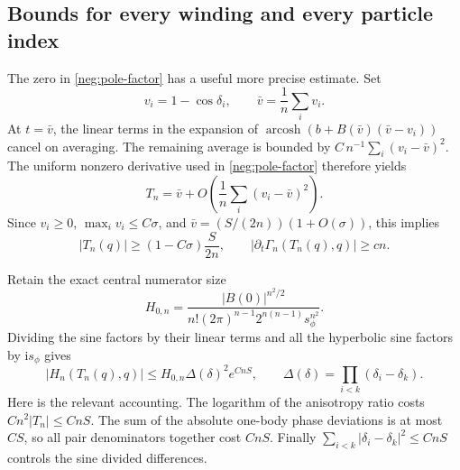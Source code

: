 \documentclass[11pt]{article}
\numberwithin{equation}{section}
\theoremstyle{definition}
\newcommand{\ii}{\mathrm i}
\begin{document}
\subsection{Bounds for every winding and every particle index}
\label{neg:all-windings}

The zero in \eqref{neg:pole-factor} has a useful more precise
estimate.  Set
\[
 v_i=1-\cos\delta_i,\qquad \bar v=\frac1n\sum_i v_i .
 \]
At \(t=\bar v\), the linear terms in the expansion of
\(\operatorname{arcosh}(b+B(\bar v)(\bar v-v_i))\) cancel on
averaging.  The remaining average is bounded by
\(C\,n^{-1}\sum_i(v_i-\bar v)^2\).  The uniform nonzero
derivative used in \eqref{neg:pole-factor} therefore yields
\[
 T_n=\bar v+
       O\!\left(\frac1n\sum_i(v_i-\bar v)^2\right).
 \]
Since \(v_i\ge0\), \(\max_i v_i\le C\sigma\), and
\(\bar v=(S/(2n))(1+O(\sigma))\), this implies
\begin{equation}
 |T_n(q)|\ge(1-C\sigma)\frac{S}{2n},
 \qquad
 |\partial_t\Gamma_n(T_n(q),q)|\ge cn .
 \label{neg:pole-lower}
\end{equation}

Retain the exact central numerator size
\begin{equation}
 H_{0,n}=
 \frac{|B(0)|^{n^2/2}}
 {n!(2\pi)^{n-1}2^{n(n-1)}s_\phi^{n^2}} .
 \label{neg:H0}
\end{equation}
Dividing the sine factors by their linear terms and all the
hyperbolic sine factors by \(\ii s_\phi\) gives
\begin{equation}
 |H_n(T_n(q),q)|
 \le H_{0,n}\Delta(\delta)^2e^{CnS},
 \qquad
 \Delta(\delta)=\prod_{i<k}(\delta_i-\delta_k).
 \label{neg:pole-density-upper}
\end{equation}
Here is the relevant accounting.  The logarithm of the anisotropy
ratio costs \(Cn^2|T_n|\le CnS\).  The sum of the absolute
one-body phase deviations is at most \(CS\), so all pair
denominators together cost \(CnS\).  Finally
\(\sum_{i<k}|\delta_i-\delta_k|^2\le CnS\) controls the sine
divided differences.
\end{document}
